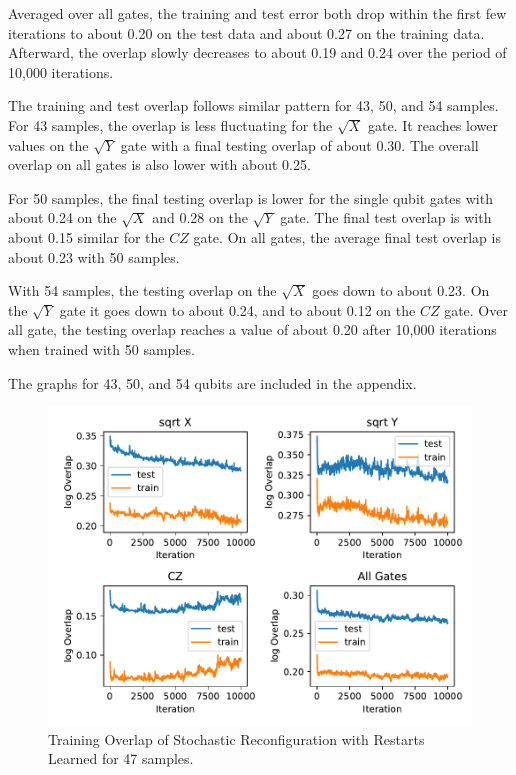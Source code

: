 Averaged over all gates, the training and test error both drop within the first few iterations to about 
0.20 on the test data and about 0.27 on the training data. Afterward, the overlap slowly decreases to about 0.19 and 
0.24 over the period of 10,000 iterations.

The training and test overlap follows similar pattern for 43, 50, and 54 samples. For 43 samples, the 
overlap is less fluctuating for the $\sqrt{X}$ gate. It reaches lower values on the $\sqrt{Y}$ gate with 
a final testing overlap of about 0.30. The overall overlap on all gates is also lower with about 0.25.

For 50 samples, the final testing overlap is lower for the single qubit gates with about 0.24 on the $\sqrt{X}$
and 0.28 on the $\sqrt{Y}$ gate. The final test overlap is with about 0.15 similar for the $CZ$ gate. On all gates, 
the average final test overlap is about 0.23 with 50 samples.

With 54 samples, the testing overlap on the $\sqrt{X}$ goes down to about 0.23. On the $\sqrt{Y}$ gate it goes 
down to about 0.24, and to about 0.12 on the $CZ$ gate. Over all gate, the testing overlap reaches a value of about 
0.20 after 10,000 iterations when trained with 50 samples.

The graphs for 43, 50, and 54 qubits are included in the appendix.

\begin{figure}[H]
  \centering
  \includegraphics[width=\textwidth]{figures/results/SR-restarts-learned/avgOverlap_47.pdf}
  \caption[Training Overlap of Stochastic Reconfiguration with Restarts Learned]{Training 
  Overlap of Stochastic Reconfiguration with Restarts Learned for 47 samples.}
  \label{fig:sr_restarts_overlap_47}
\end{figure}

